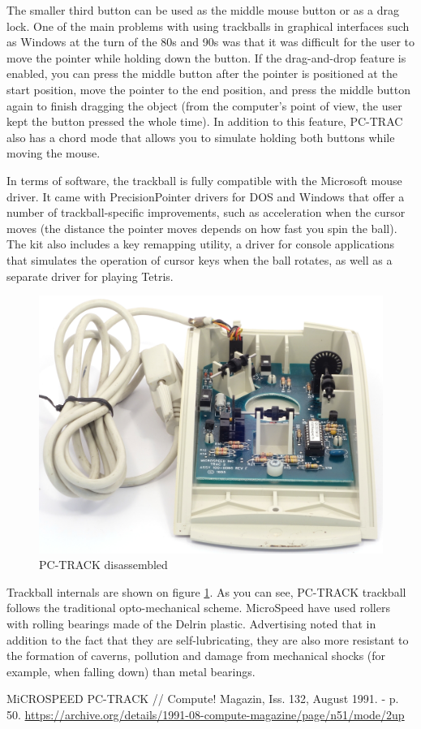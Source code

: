 \documentclass[11pt, a4paper]{article}
\begin{document}
The smaller third button can be used as the middle mouse button or as a drag lock. One of the main problems with using trackballs in graphical interfaces such as Windows at the turn of the 80s and 90s was that it was difficult for the user to move the pointer while holding down the button. If the drag-and-drop feature is enabled, you can press the middle button after the pointer is positioned at the start position, move the pointer to the end position, and press the middle button again to finish dragging the object (from the computer's point of view, the user kept the button pressed the whole time). In addition to this feature, PC-TRAC also has a chord mode that allows you to simulate holding both buttons while moving the mouse.

In terms of software, the trackball is fully compatible with the Microsoft mouse driver. It came with PrecisionPointer drivers for DOS and Windows that offer a number of trackball-specific improvements, such as acceleration when the cursor moves (the distance the pointer moves depends on how fast you spin the ball). The kit also includes a key remapping utility, a driver for console applications that simulates the operation of cursor keys when the ball rotates, as well as a separate driver for playing Tetris.

\begin{figure}[h]
    \centering
    \includegraphics[scale=0.7]{1991_microspeed_pc-track/inside_30.jpg}
    \caption{PC-TRACK disassembled}
    \label{fig:PCTRACKInside}
    \end{figure}

Trackball internals are shown on figure \ref{fig:PCTRACKInside}. As you can see, PC-TRACK trackball follows the traditional opto-mechanical scheme. MicroSpeed have used rollers with rolling bearings made of the Delrin plastic. Advertising noted that in addition to the fact that they are self-lubricating, they are also more resistant to the formation of caverns, pollution and damage from mechanical shocks (for example, when falling down) than metal bearings.

\begin{thebibliography}{9}
 MiCROSPEED PC-TRACK // Compute! Magazin,  Iss. 132, August 1991. - p. 50. \url{https://archive.org/details/1991-08-compute-magazine/page/n51/mode/2up}
\end{thebibliography}
\end{document}
